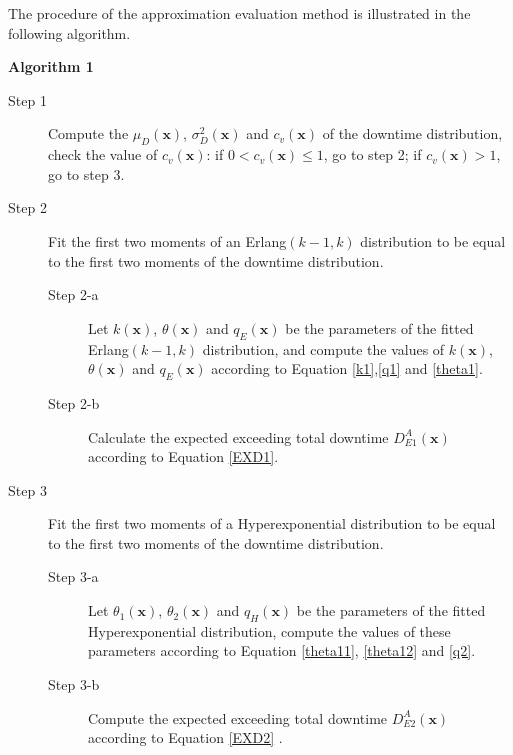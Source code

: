 \documentclass[preprint,12pt]{elsarticle}
\begin{document}
The procedure of the approximation evaluation method is illustrated in the following algorithm.

\textbf{Algorithm 1}
\label{Algorithm1}
\begin{description}
\item[Step 1] Compute the $\mu_{D}(\boldsymbol{x})$, $\sigma^{2}_{D}(\boldsymbol{x})$ and $c_{v}(\boldsymbol{x})$ of the downtime distribution, check the value of $c_{v}(\boldsymbol{x})$: if $0<c_{v}(\boldsymbol{x}) \leq 1$, go to step 2; if $c_{v}(\boldsymbol{x}) > 1$, go to step 3.
\item[Step 2] Fit the first two moments of an Erlang$(k-1, k)$ distribution to be equal to the first two moments of the downtime distribution.
 \begin{description}
 \item[Step 2-a] Let $k(\boldsymbol{x})$, $\theta(\boldsymbol{x})$ and $q_{E}(\boldsymbol{x})$ be the parameters of the fitted Erlang$(k-1,k)$ distribution, and compute the values of $k(\boldsymbol{x})$, $\theta(\boldsymbol{x})$ and $q_{E}(\boldsymbol{x})$ according to Equation \eqref{k1},\eqref{q1} and \eqref{theta1}.
 \item[Step 2-b] Calculate the expected exceeding total downtime $D_{E1}^A(\boldsymbol{x})$ according to Equation \eqref{EXD1}.
\end{description}
\item[Step 3] Fit the first two moments of a Hyperexponential distribution to be equal to the first two moments of the downtime distribution.

\begin{description}
 \item[Step 3-a] Let $\theta_{1}(\boldsymbol{x})$, $\theta_{2}(\boldsymbol{x})$ and $q_{H}(\boldsymbol{x})$ be the parameters of the fitted Hyperexponential distribution, compute the values of these parameters according to Equation \eqref{theta11}, \eqref{theta12} and \eqref{q2}.
 \item[Step 3-b] Compute the expected exceeding total downtime $D_{E2}^A(\boldsymbol{x})$ according to Equation \eqref{EXD2} .
\end{description}


\end{description}
\end{document}
